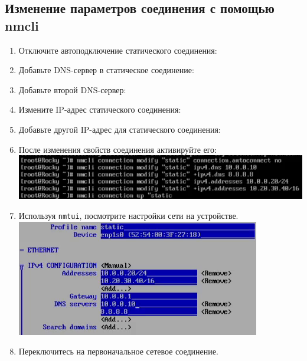 \documentclass[12pt]{article}
\begin{document}
\subsection{Изменение параметров соединения с помощью nmcli}
\begin{enumerate}
	\item Отключите автоподключение статического соединения:
	\item Добавьте DNS-сервер в статическое соединение:
	\item Добавьте второй DNS-сервер:
	\item Измените IP-адрес статического соединения:
	\item Добавьте другой IP-адрес для статического соединения:
	\item После изменения свойств соединения активируйте его:
	      \\\includegraphics{13.png}
	\item Используя \texttt{nmtui}, посмотрите настройки сети на устройстве.
	      \\\includegraphics{14.png}
	\item Переключитесь на первоначальное сетевое соединение.
\end{enumerate}
\end{document}
